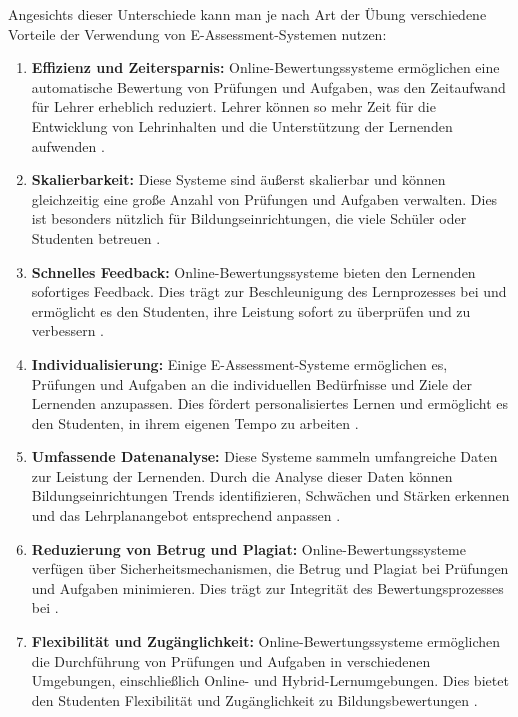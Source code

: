 Angesichts dieser Unterschiede kann man je nach Art der Übung verschiedene Vorteile der Verwendung von E-Assessment-Systemen nutzen:

\begin{enumerate}
    \item \textbf{Effizienz und Zeitersparnis:} Online-Bewertungssysteme ermöglichen eine automatische Bewertung von Prüfungen und Aufgaben, was den Zeitaufwand für Lehrer erheblich reduziert. Lehrer können so mehr Zeit für die Entwicklung von Lehrinhalten und die Unterstützung der Lernenden aufwenden \cite{alruwais2018advantages}.

    \item \textbf{Skalierbarkeit:} Diese Systeme sind äußerst skalierbar und können gleichzeitig eine große Anzahl von Prüfungen und Aufgaben verwalten. Dies ist besonders nützlich für Bildungseinrichtungen, die viele Schüler oder Studenten betreuen \cite{gruttmann2009formatives}  \cite{alruwais2018advantages}.

    \item \textbf{Schnelles Feedback:} Online-Bewertungssysteme bieten den Lernenden sofortiges Feedback. Dies trägt zur Beschleunigung des Lernprozesses bei und ermöglicht es den Studenten, ihre Leistung sofort zu überprüfen und zu verbessern \cite{gruttmann2009formatives} \cite{alruwais2018advantages}.

    \item \textbf{Individualisierung:} Einige E-Assessment-Systeme ermöglichen es, Prüfungen und Aufgaben an die individuellen Bedürfnisse und Ziele der Lernenden anzupassen. Dies fördert personalisiertes Lernen und ermöglicht es den Studenten, in ihrem eigenen Tempo zu arbeiten \cite{alruwais2018advantages}.

    \item \textbf{Umfassende Datenanalyse:} Diese Systeme sammeln umfangreiche Daten zur Leistung der Lernenden. Durch die Analyse dieser Daten können Bildungseinrichtungen Trends identifizieren, Schwächen und Stärken erkennen und das Lehrplanangebot entsprechend anpassen \cite{alruwais2018advantages}.

    \item \textbf{Reduzierung von Betrug und Plagiat:} Online-Bewertungssysteme verfügen über Sicherheitsmechanismen, die Betrug und Plagiat bei Prüfungen und Aufgaben minimieren. Dies trägt zur Integrität des Bewertungsprozesses bei \cite{alruwais2018advantages}.

    \item \textbf{Flexibilität und Zugänglichkeit:} Online-Bewertungssysteme ermöglichen die Durchführung von Prüfungen und Aufgaben in verschiedenen Umgebungen, einschließlich Online- und Hybrid-Lernumgebungen. Dies bietet den Studenten Flexibilität und Zugänglichkeit zu Bildungsbewertungen \cite{gruttmann2009formatives} \cite{alruwais2018advantages}.
\end{enumerate}

